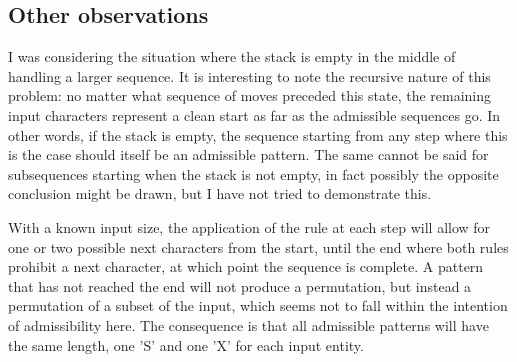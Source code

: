 \documentclass{article}
\begin{document}
\subsection*{Other observations}

I was considering the situation where the stack is empty in the middle of handling a larger sequence.  It is interesting to note the recursive nature of this problem: no matter what sequence of moves preceded this state, the remaining input characters represent a clean start as far as the admissible sequences go.  In other words, if the stack is empty, the sequence starting from any step where this is the case should itself be an admissible pattern.  The same cannot be said for subsequences starting when the stack is not empty, in fact possibly the opposite conclusion might be drawn, but I have not tried to demonstrate this.

With a known input size, the application of the rule at each step will allow for one or two possible next characters from the start, until the end where both rules prohibit a next character, at which point the sequence is complete.  A pattern that has not reached the end will not produce a permutation, but instead a permutation of a subset of the input, which seems not to fall within the intention of admissibility here.  The consequence is that all admissible patterns will have the same length, one 'S' and one 'X' for each input entity.
\end{document}
